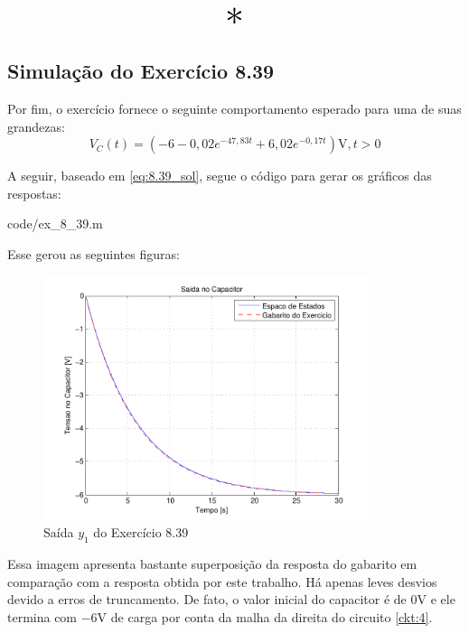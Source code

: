 \documentclass{report}
\begin{document}
\begin{center}
    \[ \scalebox{3}{$ * $} \]
\end{center}

\subsection{Simulação do Exercício 8.39}
Por fim, o exercício fornece o seguinte comportamento esperado para uma de suas grandezas:
$$ V_C(t) = \left(-6 -0,\!02e^{-47,83t} + 6,\!02e^{-0,17t}\right)\text{V}, t > 0 $$

A seguir, baseado em \ref{eq:8.39_sol}, segue o código para gerar os gráficos das respostas:

                {code/ex_8_39.m}

Esse gerou as seguintes figuras:
\begin{figure}[h!]
    \centering
    \includegraphics[width=0.85\textwidth]{images/plots/plot_8_39_y1.pdf}
    \caption{\label{plot:8.39_y1} Saída $ y_1 $ do Exercício 8.39}
\end{figure}

Essa imagem apresenta bastante superposição da resposta do gabarito em comparação com a resposta obtida
por este trabalho. Há apenas leves desvios devido a erros de truncamento. De fato, o valor inicial do capacitor
é de $ 0\text{V} $ e ele termina com $ -6\text{V} $ de carga por conta da malha da direita do circuito \ref{ckt:4}.
\end{document}
